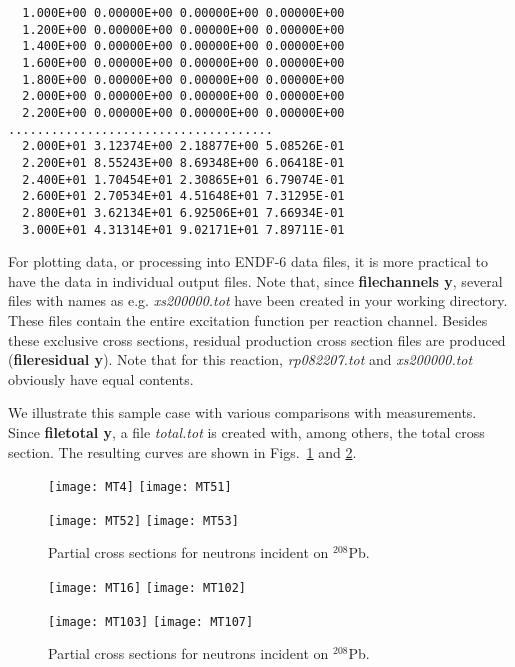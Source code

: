 \begin{samplecase}
{\begin{verbatim}
  1.000E+00 0.00000E+00 0.00000E+00 0.00000E+00                                 
  1.200E+00 0.00000E+00 0.00000E+00 0.00000E+00                                 
  1.400E+00 0.00000E+00 0.00000E+00 0.00000E+00                                 
  1.600E+00 0.00000E+00 0.00000E+00 0.00000E+00                                 
  1.800E+00 0.00000E+00 0.00000E+00 0.00000E+00                                 
  2.000E+00 0.00000E+00 0.00000E+00 0.00000E+00                                 
  2.200E+00 0.00000E+00 0.00000E+00 0.00000E+00                   
.....................................
  2.000E+01 3.12374E+00 2.18877E+00 5.08526E-01
  2.200E+01 8.55243E+00 8.69348E+00 6.06418E-01
  2.400E+01 1.70454E+01 2.30865E+01 6.79074E-01
  2.600E+01 2.70534E+01 4.51648E+01 7.31295E-01
  2.800E+01 3.62134E+01 6.92506E+01 7.66934E-01
  3.000E+01 4.31314E+01 9.02171E+01 7.89711E-01
\end{verbatim} } \renewcommand{\baselinestretch}{1.07}\small\normalsize
\noindent
For plotting data, or processing into ENDF-6 data files, it is more practical
to have the data in individual output files. Note that, since 
{\bf filechannels y}, several files with names as e.g. {\em xs200000.tot} have 
been created in your working directory. These files contain the entire
excitation function per reaction channel.
Besides these 
exclusive cross sections, residual production cross section files are produced
({\bf fileresidual y}).
Note that for this reaction, {\em rp082207.tot} and {\em xs200000.tot} 
obviously have equal contents. 

We illustrate this sample case with various comparisons with measurements. Since
{\bf filetotal y}, a file {\em total.tot} is created with, among others, the 
total cross section. The resulting curves are shown in Figs.~\ref{pbpart1} and 
\ref{pbpart2}.
\end{samplecase}
\begin{figure}
\vspace*{-5mm}
\centerline{
\centering\texttt{[image: MT4]} \centering\texttt{[image: MT51]}
}
\centerline{
\centering\texttt{[image: MT52]} \centering\texttt{[image: MT53]}
}
\caption{Partial cross sections for neutrons incident on ${}^{208}$Pb.}
\label{pbpart1}
\end{figure}
\begin{figure}
\vspace*{-15mm}
\centerline{
\centering\texttt{[image: MT16]} \centering\texttt{[image: MT102]}
}
\centerline{
\centering\texttt{[image: MT103]} \centering\texttt{[image: MT107]}
}
\caption{Partial cross sections for neutrons incident on ${}^{208}$Pb.}
\label{pbpart2}
\end{figure}
